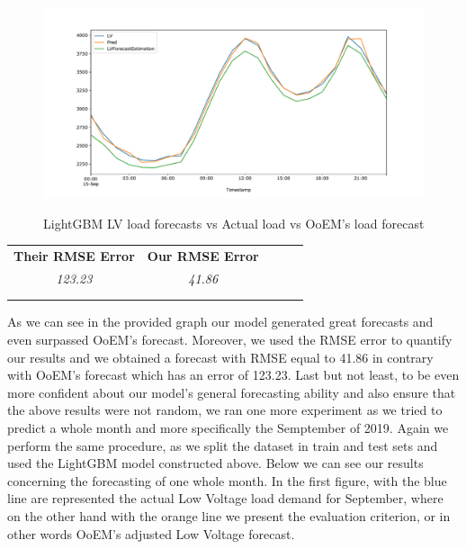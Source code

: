 \begin{figure}[h!]
\centering
\includegraphics[width=1\linewidth]{project/final4.pdf}
\label{fig:felix}
\caption{LightGBM LV load forecasts vs Actual load vs OoEM’s load forecast}
\end{figure}
\begin{table}[h!]
\centering
\begin{tabular}{lllll}
\cline{1-2}
\multicolumn{1}{|l|}{\textbf{Their RMSE Error}} & \multicolumn{1}{l|}{\textbf{Our RMSE Error}} &  &  &  \\ \cline{1-2}
\multicolumn{1}{|c|}{\textit{123.23}} & \multicolumn{1}{c|}{\textit{41.86}} &  &  &  \\ \cline{1-2}
                                &                                &  &  &  \\
                                &                                &  &  & 
\end{tabular}
\end{table}
\par As we can see in the provided graph our model generated great forecasts and even surpassed OoEM's forecast. Moreover, we used the RMSE error to quantify our results and we obtained a forecast with RMSE equal to 41.86 in contrary with OoEM's forecast which has an error of 123.23. Last but not least, to be even more confident about our model's general forecasting ability and also ensure that the above results were not random, we ran one more experiment as we tried to predict a whole month and more specifically the Semptember of 2019. Again we perform the same procedure, as we split the dataset in train and test sets and used the LightGBM model constructed above. Below we can see our results concerning the forecasting of one whole month. In the first figure, with the blue line are represented the actual Low Voltage load demand for September, where on the other hand with the orange line we present the evaluation criterion, or in other words OoEM's adjusted Low Voltage forecast.
